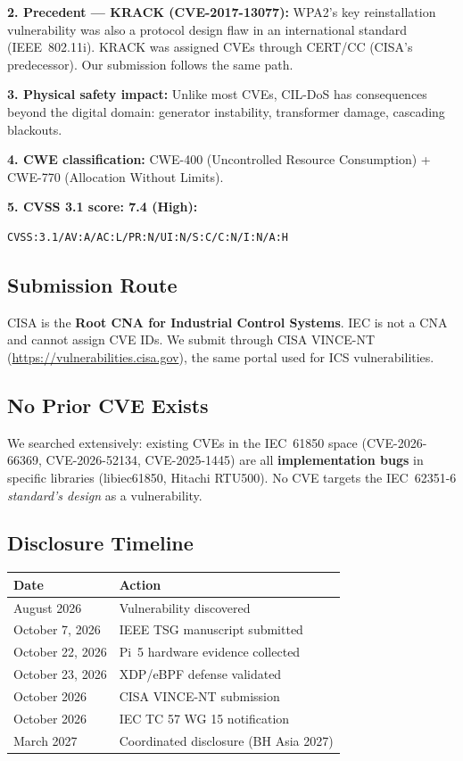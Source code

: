 \documentclass[11pt,a4paper,twocolumn]{article}
\begin{document}
\textbf{2. Precedent --- KRACK (CVE-2017-13077):} WPA2's key reinstallation vulnerability was also a protocol design flaw in an international standard (IEEE~802.11i). KRACK was assigned CVEs through CERT/CC (CISA's predecessor). Our submission follows the same path.

\textbf{3. Physical safety impact:} Unlike most CVEs, CIL-DoS has consequences beyond the digital domain: generator instability, transformer damage, cascading blackouts.

\textbf{4. CWE classification:} CWE-400 (Uncontrolled Resource Consumption) + CWE-770 (Allocation Without Limits).

\textbf{5. CVSS 3.1 score: 7.4 (High):}
\begin{verbatim}
CVSS:3.1/AV:A/AC:L/PR:N/UI:N/S:C/C:N/I:N/A:H
\end{verbatim}

\subsection{Submission Route}

CISA is the \textbf{Root CNA for Industrial Control Systems}. IEC is not a CNA and cannot assign CVE IDs. We submit through CISA VINCE-NT (\url{https://vulnerabilities.cisa.gov}), the same portal used for ICS vulnerabilities.

\subsection{No Prior CVE Exists}

We searched extensively: existing CVEs in the IEC~61850 space (CVE-2026-66369, CVE-2026-52134, CVE-2025-1445) are all \textbf{implementation bugs} in specific libraries (libiec61850, Hitachi RTU500). No CVE targets the IEC~62351-6 \emph{standard's design} as a vulnerability.

\subsection{Disclosure Timeline}

\begin{table}[H]
\centering
\scriptsize
\begin{tabular}{@{}ll@{}}
\toprule
\textbf{Date} & \textbf{Action} \\
\midrule
August 2026 & Vulnerability discovered \\
October 7, 2026 & IEEE TSG manuscript submitted \\
October 22, 2026 & Pi~5 hardware evidence collected \\
October 23, 2026 & XDP/eBPF defense validated \\
October 2026 & CISA VINCE-NT submission \\
October 2026 & IEC TC 57 WG 15 notification \\
March 2027 & Coordinated disclosure (BH Asia 2027) \\
\bottomrule
\end{tabular}
\end{table}
\end{document}
